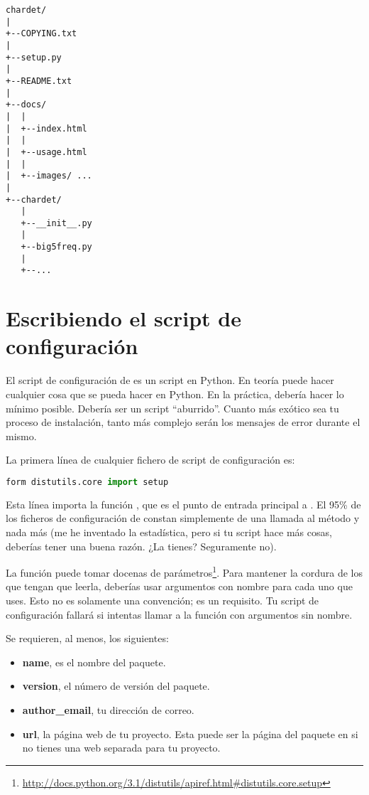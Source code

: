 \begin{lstlisting}[breaklines=true]
chardet/
|
+--COPYING.txt
|
+--setup.py
|
+--README.txt
|
+--docs/
|  |
|  +--index.html
|  |
|  +--usage.html
|  |
|  +--images/ ...
|
+--chardet/
   |
   +--__init__.py
   |
   +--big5freq.py
   |
   +--...
\end{lstlisting}

\section{Escribiendo el script de configuración}

El script de configuración de  es un script en Python. En teoría puede hacer cualquier cosa que se pueda hacer en Python. En la práctica, debería hacer lo mínimo posible. Debería ser un script ``aburrido''. Cuanto más exótico sea tu proceso de instalación, tanto más complejo serán los mensajes de error durante el mismo.

La primera línea de cualquier fichero de script de configuración es:


\begin{lstlisting}[language=Python,breaklines=true]
form distutils.core import setup
\end{lstlisting}

Esta línea importa la función , que es el punto de entrada principal a . El 95\% de los ficheros de configuración de  constan simplemente de una llamada al método  y nada más (me he inventado la estadística, pero si tu script hace más cosas, deberías tener una buena razón. ¿La tienes? Seguramente no).

La función  puede tomar docenas de parámetros\footnote{\href{http://docs.python.org/3.1/distutils/apiref.html\#distutils.core.setup}{http://docs.python.org/3.1/distutils/apiref.html\#distutils.core.setup}}. Para mantener la cordura de los que tengan que leerla, deberías usar argumentos con nombre para cada uno que uses. Esto no es solamente una convención; es un requisito. Tu script de configuración fallará si intentas llamar a la función con argumentos sin nombre.

Se requieren, al menos, los siguientes:

\begin{itemize}
  \item \textbf{name}, es el nombre del paquete.
  \item \textbf{version}, el número de versión del paquete.
  \item \textbf{author\_email}, tu dirección de correo.
  \item \textbf{url}, la página web de tu proyecto. Esta puede ser la página del paquete en  si no tienes una web separada para tu proyecto.
\end{itemize}

